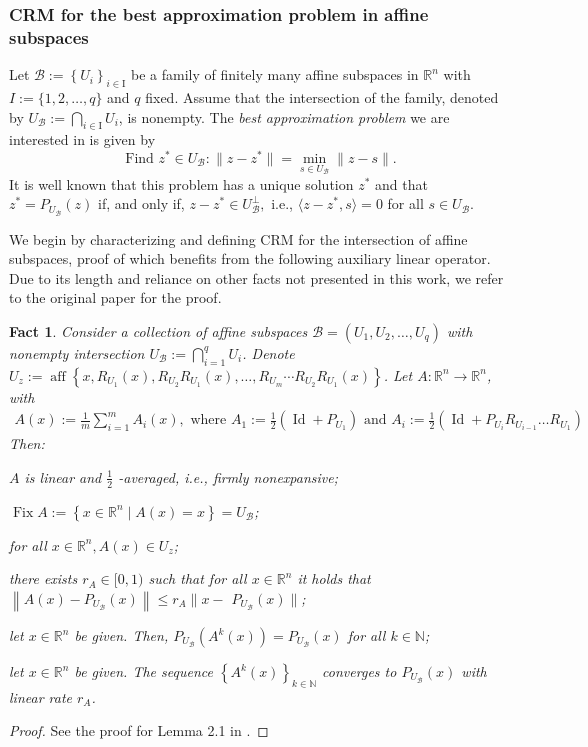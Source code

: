\documentclass[smallextended,numbook,nospthms]{svjour3}
\theoremstyle{plain}
\newtheorem{fact}[theorem]{Fact}
\theoremstyle{definition}
\def\RR{\mathds R}
\def\NN{\mathds N}
\DeclareMathOperator{\Id}{Id}
\DeclareMathOperator{\Fix}{Fix}
\begin{document}
\subsubsection{CRM for the best approximation problem in affine subspaces}
Let $\mathcal{B}:=\left\{U_{i}\right\}_{i \in \mathrm{I}}$ be a family of finitely many affine subspaces in $\RR^{n}$ with $I:=\{1,2, \ldots, q\}$ and $q$ fixed. Assume that the intersection of the family, denoted by $U_{\mathcal{B}}:=\bigcap_{i \in \mathrm{I}} U_{i}$, is nonempty. The \emph{best approximation problem} we are interested in is given by
$$
\text{Find }z^* \in U_{\mathcal{B}}: \|z-z^*\| = \min _{s \in U_{\mathcal{B}}}\|z-s\|.
$$
It is well known that this problem has a unique solution $z^*$ and that $z^*=P_{U_{\mathcal{B}}}(z)$ if, and only if, $z-z^* \in U_{\mathcal{B}}^{\perp},$ i.e., $\langle z-z^*, s\rangle=0$ for all $s \in U_{\mathcal{B}}$.

We begin by characterizing and defining CRM for the intersection of affine subspaces, proof of which benefits from the following auxiliary linear operator. Due to its length and reliance on other facts not presented in this work, we refer to the original paper for the proof.
\begin{fact}\label{fact:CRM aux op}
	Consider a collection of affine subspaces $\mathcal{B}=\left(U_{1}, U_{2}, \ldots, U_{q}\right)$ with nonempty intersection $U_{\mathcal{B}}:=\bigcap_{i=1}^{q} U_{i}$. Denote $U_{z}:= \operatorname{aff}\left\{x, R_{U_{1}}(x), R_{U_{2}} R_{U_{1}}(x), \ldots, R_{U_{m}} \cdots R_{U_{2}} R_{U_{1}}(x)\right\}$. Let $A: \RR^{n} \rightarrow \RR^{n}$, with
	\begin{align}
		A(x):=\frac{1}{m} \sum_{i=1}^{m} A_{i}(x), \text { where } 
		A_{1}:=\frac{1}{2}\left(\Id+P_{U_{1}}\right) \text { and }  A_{i}:=\frac{1}{2}\left(\Id+P_{U_{i}} R_{U_{i-1}} \ldots R_{U_{1}}\right)
	\end{align}
	Then:
	\begin{listi}
		\item $A$ is linear and $\frac{1}{2}$ -averaged, i.e., firmly nonexpansive;
		\item $\Fix A:=\left\{x \in \RR^{n} \mid A(x)=x\right\}=U_{\mathcal{B}}$;
		\item for all $x \in \RR^{n}, A(x) \in U_{z}$;
		\item there exists $r_{A} \in[0,1)$ such that for all $x \in \RR^{n}$ it holds that $\left\|A(x)-P_{U_{\mathcal{B}}}(x)\right\| \leq r_{A} \| x-$ $P_{U_{\mathcal{B}}}(x)\|$;
		\item let $x \in \RR^{n}$ be given. Then, $P_{U_{\mathcal{B}}}\left(A^{k}(x)\right)=P_{U_{\mathcal{B}}}(x)$ for all $k \in \NN$;
		\item let $x \in \RR^{n}$ be given. The sequence $\left\{A^{k}(x)\right\}_{k \in \NN}$ converges to $P_{U_{\mathcal{B}}}(x)$ with linear rate $r_{A}$.
	\end{listi}
\end{fact}
\begin{proof}
	See the proof for Lemma 2.1 in \cite{Behling:2018a}.
\end{proof}
\end{document}
